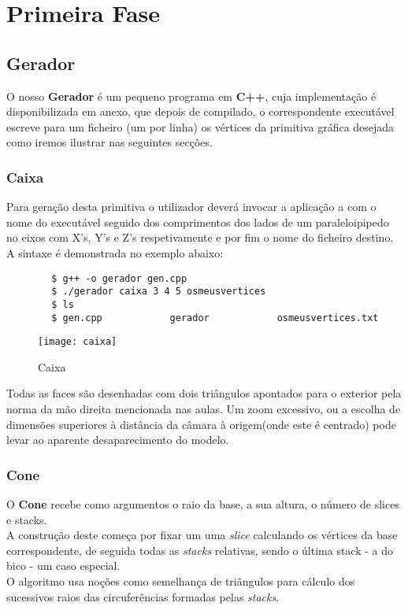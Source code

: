 \documentclass{article}
\begin{document}
\newpage

\section{Primeira Fase}

\subsection{Gerador}
O nosso \textbf{Gerador} é um pequeno programa em \textbf{C++}, cuja implementação é disponibilizada em anexo, que depois de compilado, o correspondente executável escreve para um ficheiro (um por linha) os vértices da primitiva gráfica desejada  como iremos ilustrar nas seguintes secções.


\subsubsection{Caixa}
Para geração desta primitiva o utilizador deverá invocar a aplicação a com o nome do executável seguido dos comprimentos dos lados de um paraleloipipedo no eixos com X’s, Y’s e Z’s respetivamente e por fim o nome do ficheiro destino. A sintaxe é demonstrada no exemplo abaixo:

\begin{commandline}
    \begin{verbatim}
        $ g++ -o gerador gen.cpp
        $ ./gerador caixa 3 4 5 osmeusvertices
        $ ls
        $ gen.cpp            gerador            osmeusvertices.txt
    \end{verbatim}
\end{commandline}

\begin{figure}[H]
	\centering
	\texttt{[image: caixa]}
	\caption{Caixa}
\end{figure}

\begin{warn}[Notice:]
Todas as faces são desenhadas com dois triângulos apontados para o exterior pela norma da mão direita mencionada nas aulas. Um zoom excessivo, ou a escolha de dimensões superiores à distância da câmara à origem(onde este é centrado)  pode levar ao aparente desaparecimento do modelo.
\end{warn}

\subsubsection{Cone}
O \textbf{Cone} recebe como argumentos o raio da base, a sua altura, o número de slices e stacks. \\
A construção deste começa por fixar um uma \textit{slice} calculando os vértices da base correspondente, de seguida todas as \textit{stacks} relativas, sendo o última stack - a do bico - um caso especial. \\
O algoritmo usa noções como semelhança de triângulos para cálculo dos sucessivos raios das circuferências formadas pelas \textit{stacks}.\\
\end{document}

